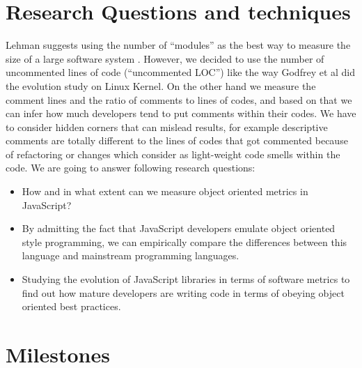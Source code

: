\documentclass[conference]{IEEEtran}
\begin{document}
	
	\section{Research Questions and techniques}
	Lehman suggests using the number of “modules” as the best way to measure the size of a large software system \cite{637156}. However, we decided to use the number of uncommented lines of code (“uncommented LOC”) like the way Godfrey et al \cite{883030} did the evolution study on Linux Kernel. On the other hand we measure the comment lines and the ratio of comments to lines of codes, and based on that we can infer how much developers tend to put comments within their codes. We have to consider hidden corners that can mislead results, for example descriptive comments are totally different to the lines of codes that got commented because of refactoring or changes which consider as light-weight code smells within the code.
	We are going to answer following research questions:
	
		\begin{itemize}
			\item How and in what extent can we measure object oriented metrics in JavaScript?
			\item  By admitting the fact that JavaScript developers emulate object oriented style programming, we can empirically compare the differences between this language and mainstream programming languages.
			\item Studying the evolution of JavaScript libraries in terms of software metrics to find out how mature developers are writing code in terms of obeying object oriented best practices.
		\end{itemize}
	

	
	
	\label{sec:rq}
	
	\section{Milestones}
	
	
	
\end{document}
